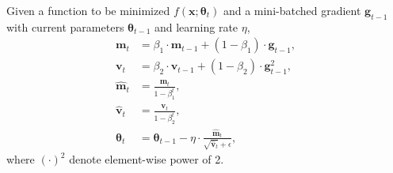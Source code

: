 \begin{update}
  Given a function to be minimized $f \left(\mathbf{x} ; \boldsymbol\theta_t\right)$
  and a mini-batched gradient $\mathbf{g}_{t-1}$
  with current parameters $\boldsymbol\theta_{t-1}$
  and learning rate $\eta$,
  \begin{equation*}
    \begin{aligned}
      \mathbf{m}_{t}           & = \beta_1 \cdot \mathbf{m}_{t-1} + (1 - \beta_1)\cdot \mathbf{g}_{t-1},                                       \\
      \mathbf{v}_{t}           & = \beta_2 \cdot \mathbf{v}_{t-1} + (1 - \beta_2)\cdot \mathbf{g}_{t-1}^2,                                     \\
      \widehat{\mathbf{m}}_{t} & = \frac{\mathbf{m}_{t}}{1 - \beta_1^t},                                                                       \\
      \widehat{\mathbf{v}}_{t} & = \frac{\mathbf{v}_{t}}{1 - \beta_2^t},                                                                       \\
      \boldsymbol\theta_{t}    & = \boldsymbol\theta_{t-1} - \eta \cdot \frac{\widehat{\mathbf{m}}_t}{\sqrt{\widehat{\mathbf{v}}_t}+\epsilon},
    \end{aligned}
  \end{equation*}
  where $\left(\cdot\right)^2$ denote element-wise power of 2.
\end{update}

